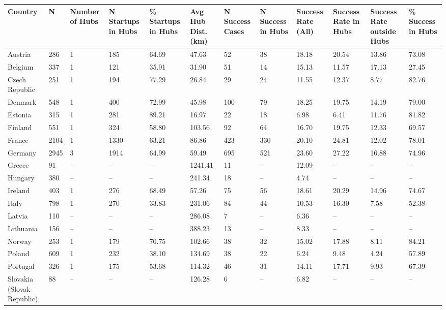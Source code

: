 \begin{tabular}{llllllllllll}
  \toprule
Country & N & Number of Hubs & N Startups in Hubs & \% Startups in Hubs & Avg Hub Dist. (km) & N Success Cases & N Success in Hubs & Success Rate (All) & Success Rate in Hubs & Success Rate outside Hubs & \% Success in Hubs \\ 
  \midrule
Austria & 286 & 1 & 185 & 64.69 & 47.63 & 52 & 38 & 18.18 & 20.54 & 13.86 & 73.08 \\ 
  Belgium & 337 & 1 & 121 & 35.91 & 31.90 & 51 & 14 & 15.13 & 11.57 & 17.13 & 27.45 \\ 
  Czech Republic & 251 & 1 & 194 & 77.29 & 26.84 & 29 & 24 & 11.55 & 12.37 & 8.77 & 82.76 \\ 
  Denmark & 548 & 1 & 400 & 72.99 & 45.98 & 100 & 79 & 18.25 & 19.75 & 14.19 & 79.00 \\ 
  Estonia & 315 & 1 & 281 & 89.21 & 16.97 & 22 & 18 & 6.98 & 6.41 & 11.76 & 81.82 \\ 
  Finland & 551 & 1 & 324 & 58.80 & 103.56 & 92 & 64 & 16.70 & 19.75 & 12.33 & 69.57 \\ 
  France & 2104 & 1 & 1330 & 63.21 & 86.86 & 423 & 330 & 20.10 & 24.81 & 12.02 & 78.01 \\ 
  Germany & 2945 & 3 & 1914 & 64.99 & 59.49 & 695 & 521 & 23.60 & 27.22 & 16.88 & 74.96 \\ 
  Greece & 91 & – & – & – & 1241.41 & 11 & – & 12.09 & – & – & – \\ 
  Hungary & 380 & – & – & – & 241.34 & 18 & – & 4.74 & – & – & – \\ 
  Ireland & 403 & 1 & 276 & 68.49 & 57.26 & 75 & 56 & 18.61 & 20.29 & 14.96 & 74.67 \\ 
  Italy & 798 & 1 & 270 & 33.83 & 231.06 & 84 & 44 & 10.53 & 16.30 & 7.58 & 52.38 \\ 
  Latvia & 110 & – & – & – & 286.08 & 7 & – & 6.36 & – & – & – \\ 
  Lithuania & 156 & – & – & – & 388.23 & 13 & – & 8.33 & – & – & – \\ 
  Norway & 253 & 1 & 179 & 70.75 & 102.66 & 38 & 32 & 15.02 & 17.88 & 8.11 & 84.21 \\ 
  Poland & 609 & 1 & 232 & 38.10 & 134.69 & 38 & 22 & 6.24 & 9.48 & 4.24 & 57.89 \\ 
  Portugal & 326 & 1 & 175 & 53.68 & 114.32 & 46 & 31 & 14.11 & 17.71 & 9.93 & 67.39 \\ 
  Slovakia (Slovak Republic) & 88 & – & – & – & 126.28 & 6 & – & 6.82 & – & – & – \\ 

\end{tabular}
